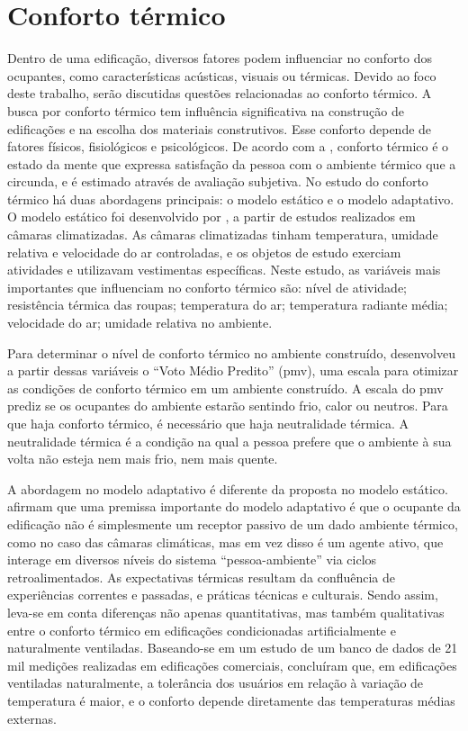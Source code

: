\documentclass[brazil,hardcopy,openany]{ufscthesis} %
\begin{document}
\section{Conforto térmico}

Dentro de uma edificação, diversos fatores podem influenciar no conforto dos ocupantes, como características acústicas, visuais ou térmicas. Devido ao foco deste trabalho, serão discutidas questões relacionadas ao conforto térmico.
A busca por conforto térmico tem influência significativa na construção de edificações e na escolha dos materiais construtivos. Esse conforto depende de fatores físicos, fisiológicos e psicológicos. De acordo com a , conforto térmico é o estado da mente que expressa satisfação da pessoa com o ambiente térmico que a circunda, e é estimado através de avaliação subjetiva. No estudo do conforto térmico há duas abordagens principais: o modelo estático e o modelo adaptativo. %
O modelo estático foi desenvolvido por , a partir de estudos realizados em câmaras climatizadas. As câmaras climatizadas tinham temperatura, umidade relativa e velocidade do ar controladas, e os objetos de estudo exerciam atividades e utilizavam vestimentas específicas. Neste estudo, as variáveis mais importantes que influenciam no conforto térmico são: nível de atividade; resistência térmica das roupas; temperatura do ar; temperatura radiante média; velocidade do ar; umidade relativa no ambiente.

Para determinar o nível de conforto térmico no ambiente construído,  desenvolveu a partir dessas variáveis o “Voto Médio Predito” (\acrshort{pmv}), uma escala para otimizar as condições de conforto térmico em um ambiente construído. A escala do \acrshort{pmv} prediz se os ocupantes do ambiente estarão sentindo frio, calor ou neutros. Para que haja conforto térmico, é necessário que haja neutralidade térmica. A neutralidade térmica é a condição na qual a pessoa prefere que o ambiente à sua volta não esteja nem mais frio, nem mais quente.

A abordagem no modelo adaptativo é diferente da proposta no modelo estático.  afirmam que uma premissa importante do modelo adaptativo é que o ocupante da edificação não é simplesmente um receptor passivo de um dado ambiente térmico, como no caso das câmaras climáticas, mas em vez disso é um agente ativo, que interage em diversos níveis do sistema “pessoa-ambiente” via ciclos retroalimentados. As expectativas térmicas resultam da confluência de experiências correntes e passadas, e práticas técnicas e culturais. Sendo assim, leva-se em conta diferenças não apenas quantitativas, mas também qualitativas entre o conforto térmico em edificações condicionadas artificialmente e naturalmente ventiladas. Baseando-se em um estudo de um banco de dados de 21 mil medições realizadas em edificações comerciais,  concluíram que, em edificações ventiladas naturalmente, a tolerância dos usuários em relação à variação de temperatura é maior, e o conforto depende diretamente das temperaturas médias externas.
\end{document}
